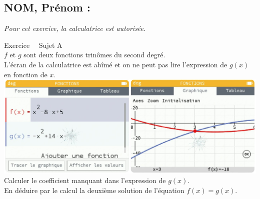 \documentclass[a4paper,11pt,eval]{nsi}
\newcounter{exoNum}
\newcommand{\exo}[1]
{
	\addtocounter{exoNum}{1}
	{\titlefont\color{UGLiBlue}\Large Exercice\ \theexoNum\ \normalsize{#1}}\smallskip	
}
\begin{document}
\subsection*{NOM, Prénom : \dotfill} 
\textit{Pour cet exercice, la calculatrice est autorisée.}\\

\exo{ Sujet A}\\
$f$ et $g$ sont deux fonctions trinômes du second degré.\\
L'écran de la calculatrice est abîmé et on ne peut pas lire l'expression de $g(x)$ en fonction de $x$.\\[.5em]
\includegraphics[width=17cm]{calculatrice.jpg}\\[.5em]
Calculer le coefficient manquant dans l'expression de $g(x)$.\\
En déduire par le calcul la deuxième solution de l'équation $f(x)=g(x)$.\\[.5em]
\\
\end{document}

